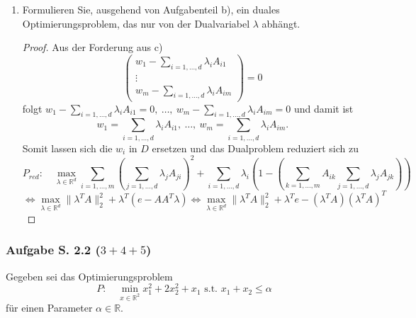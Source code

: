 \documentclass[12pt]{extreport} %
\newcommand{\R}{\mathbb{R}}
\theoremstyle{named}
\theoremstyle{nnamed}
\theoremstyle{itshape}
\theoremstyle{normal}
\begin{document}
\begin{enumerate}
\begin{proof}
			$$ \text{ s.t. } \left(\begin{array}{c} w_1 -\sum_{i=1,\dotsc,d}  \lambda_i A_{i1}  \\ \vdots \\ w_m -\sum_{i=1,\dotsc,d}  \lambda_i A_{im} \end{array}\right) = 0 $$
		\end{proof}
	\item Formulieren Sie, ausgehend von Aufgabenteil b), ein duales Optimierungsproblem, das nur von der Dualvariabel $\lambda$ abhängt.
		\begin{proof}
			Aus der Forderung aus c)
			$$ \left(\begin{array}{c} w_1 -\sum_{i=1,\dotsc,d}  \lambda_i A_{i1}  \\ \vdots \\ w_m -\sum_{i=1,\dotsc,d}  \lambda_i A_{im} \end{array}\right)  = 0 $$
			folgt $w_1 -\sum_{i=1,\dotsc,d}  \lambda_i A_{i1} = 0, ~ \dotsc, ~ w_m -\sum_{i=1,\dotsc,d}  \lambda_i A_{im} = 0$ und damit ist $$w_1 = \sum_{i=1,\dotsc,d}  \lambda_i A_{i1}, ~ \dotsc, ~ w_m = \sum_{i=1,\dotsc,d}  \lambda_i A_{im}. $$
			Somit lassen sich die $w_i$ in $D$ ersetzen und das Dualproblem reduziert sich zu
		 	$$ P_{red}: \quad \max_{\lambda \in \R^d} \sum_{i=1, \dotsc,m } \left( \sum_{j=1, \dotsc, d} \lambda_j A_{ji} \right)^2 + \sum_{i = 1, \dotsc, d} \lambda_i \left( 1 - \left(\sum_{k = 1, \dotsc, m} A_{ik}  \sum_{j=1, \dotsc, d} \lambda_j A_{jk} \right) \right) $$
		 	$$ \iff \max_{\lambda \in \R^d}\| \lambda^T A \|_2^2 +  \lambda^T \left( e - A A^T \lambda  \right)  \iff \max_{\lambda \in \R^d}\| \lambda^T A \|_2^2 +  \lambda^T e - \left( \lambda^T A \right) \left( \lambda^T A \right)^T  $$
		\end{proof}
\end{enumerate}

\newpage

\subsubsection{Aufgabe S. 2.2 (\textit{$3 + 4 + 5$})}

Gegeben sei das Optimierungsproblem
$$ P: \quad \min_{x \in \R^2} x_1^2 + 2 x_2^2 + x_1 \text{ s.t. } x_1 + x_2 \leq \alpha $$
für einen Parameter $\alpha \in \R$.
\end{document}
